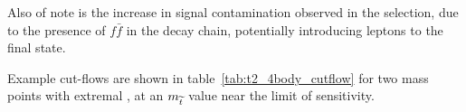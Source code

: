 Also of note is the increase in signal contamination observed in the \mj 
selection, due to the presence of $f\bar{f}$ in the decay chain, potentially 
introducing leptons to the final state.

Example cut-flows are shown in table~\ref{tab:t2_4body_cutflow} for two mass
points with extremal \deltam, at an $m_{\widetilde{t}}$ value near the limit
of sensitivity.







